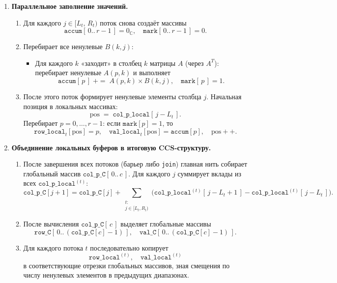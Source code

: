 \documentclass[12pt]{article}
\begin{document}
\begin{enumerate}
    \item \textbf{Параллельное заполнение значений.}
    \begin{enumerate}
        \item Для каждого \(j\in [L_t,\,R_t)\) поток снова создаёт массивы
        \[
            \texttt{accum}[\,0..\,r-1\,]=0_{\mathbb{C}},\quad
            \texttt{mark}[\,0..\,r-1\,]=0.
        \]
        \item Перебирает все ненулевые \(B(k,j)\):
        \begin{itemize}
            \item Для каждого \(k\) «заходит» в столбец \(k\) матрицы \(A\) (через \(A^T\)): перебирает ненулевые \(A(p,k)\) и выполняет
            \[
                \texttt{accum}[\,p\,] \;+=\; A(p,k)\times B(k,j),\quad
                \texttt{mark}[\,p\,]=1.
            \]
        \end{itemize}
        \item После этого поток формирует ненулевые элементы столбца \(j\). Начальная позиция в локальных массивах:
        \[
            \text{pos} \;=\; \texttt{col\_p\_local}[\,j - L_t\,].
        \]
        Перебирает \(p=0,\dots,r-1\): если \(\texttt{mark}[p]=1\), то
        \[
            \texttt{row\_local}_t[\text{pos}] = p,\quad
            \texttt{val\_local}_t[\text{pos}] = \texttt{accum}[p],\quad
            \text{pos}++.
        \]
    \end{enumerate}

    \item \textbf{Объединение локальных буферов в итоговую CCS-структуру.}
    \begin{enumerate}
        \item После завершения всех потоков (барьер либо \texttt{join}) главная нить собирает глобальный массив \(\texttt{col\_p\_C}[\,0..\,c\,]\). Для каждого \(j\) суммирует вклады из всех \(\texttt{col\_p\_local}^{(t)}\):
        \[
            \texttt{col\_p\_C}[j+1]
            =
            \texttt{col\_p\_C}[j]
            +
            \sum_{\substack{t:\\j\in[L_t,R_t)}} 
            \bigl(\texttt{col\_p\_local}^{(t)}[\,j - L_t + 1\,] 
            - \texttt{col\_p\_local}^{(t)}[\,j - L_t\,]\bigr).
        \]
        \item После вычисления \(\texttt{col\_p\_C}[\,c\,]\) выделяет глобальные массивы
        \[
            \texttt{row\_C}[\,0..\,(\texttt{col\_p\_C}[c]-1)\,],\quad
            \texttt{val\_C}[\,0..\,(\texttt{col\_p\_C}[c]-1)\,].
        \]
        \item Для каждого потока \(t\) последовательно копирует
        \[
            \texttt{row\_local}^{(t)},\quad
            \texttt{val\_local}^{(t)}
        \]
        в соответствующие отрезки глобальных массивов, зная смещения по числу ненулевых элементов в предыдущих диапазонах.
    \end{enumerate}
\end{enumerate}
\end{document}
